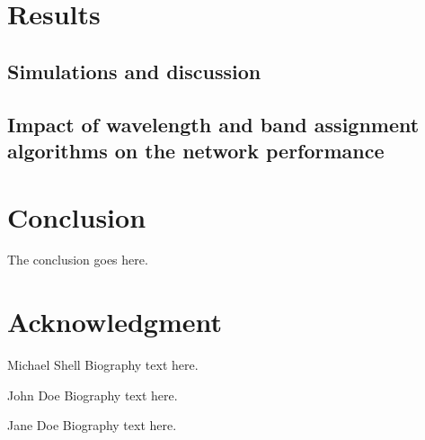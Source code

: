 \documentclass[journal,comsoc]{IEEEtran}
\begin{document}
\section{Results}

\subsection{Simulations and discussion}

\subsection{Impact of wavelength and band assignment algorithms on the network performance}

\section{Conclusion}
The conclusion goes here.

\appendices

\section*{Acknowledgment}

\ifCLASSOPTIONcaptionsoff
  \newpage
\fi




\begin{IEEEbiography}{Michael Shell}
Biography text here.
\end{IEEEbiography}

\begin{IEEEbiographynophoto}{John Doe}
Biography text here.
\end{IEEEbiographynophoto}

\begin{IEEEbiographynophoto}{Jane Doe}
Biography text here.
\end{IEEEbiographynophoto}
\end{document}
